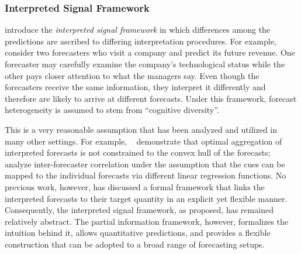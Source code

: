 \documentclass[11pt]{article}
\theoremstyle{definition}
\theoremstyle{definition}
\def\X{{\bf X}}
\begin{document}
\subsubsection{Interpreted Signal Framework}

\citet{hong2009interpreted} introduce the {\em interpreted signal
framework} in which 
differences among the 
predictions are ascribed to differing interpretation procedures.  For
example, consider two forecasters who visit a company and predict its future revenue. One forecaster may carefully examine the company's technological status while the other pays closer attention to what the managers say.  Even though the
forecasters receive the same information, they interpret it
differently and therefore are likely to arrive at different forecasts. Under this framework, forecast heterogeneity is assumed to stem from ``cognitive
diversity''.  

This is a very reasonable assumption that has been analyzed and
utilized in many other settings.  For example,
~\citet{parunak2013characterizing} demonstrate that optimal
aggregation of interpreted forecasts is not constrained to the
convex hull of the forecasts; \citet{broomell2009experts} analyze
inter-forecaster correlation under the assumption that the cues can be
mapped to the individual forecasts via different linear regression
functions.
%
No previous work, however, has discussed a formal framework that links the interpreted forecasts to their target quantity in an explicit yet flexible manner. Consequently, the interpreted signal framework, as proposed, has remained relatively abstract. The partial information framework, however, formalizes the intuition behind it, allows quantitative predictions, and provides a flexible construction that can be adopted to a broad range of forecasting setups. 

\end{document}
